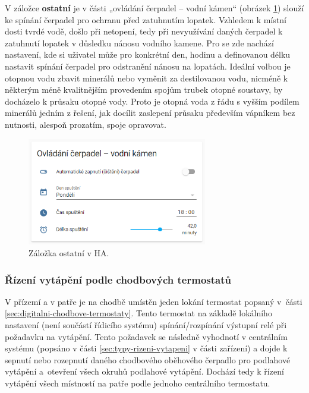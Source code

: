 V záložce \textbf{ostatní} je v části „ovládání čerpadel – vodní kámen“ (obrázek \ref{fig:zalozka-ostatni}) slouží ke spínání čerpadel pro ochranu před zatuhnutím lopatek. Vzhledem k místní dosti tvrdé vodě, došlo při netopení, tedy při nevyužívání daných čerpadel k zatuhnutí lopatek v důsledku nánosu vodního kamene. Pro se zde nachází nastavení, kde si uživatel může pro konkrétní den, hodinu a definovanou délku nastavit spínání čerpadel pro odstranění nánosu na lopatách. Ideální volbou je otopnou vodu zbavit minerálů nebo vyměnit za destilovanou vodu, nicméně k některým méně kvalitnějším provedením spojům trubek otopné soustavy, by docházelo k průsaku otopné vody. Proto je otopná voda z řádu s vyšším podílem minerálů jedním z řešení, jak docílit zaslepení průsaku především vápníkem bez nutnosti, alespoň prozatím, spoje opravovat.

\begin{figure}[H]
    \centering
    \includegraphics[width=0.7\textwidth]{images/software-ha/zalozka-ostatni.png}
    \caption{Záložka ostatní v HA.}
    \label{fig:zalozka-ostatni}
\end{figure}


\subsubsection{Řízení vytápění podle chodbových termostatů}
V přízemí a v patře je na chodbě umístěn jeden lokání termostat popsaný v~části \ref{sec:digitalni-chodbove-termostaty}. Tento termostat na základě lokálního nastavení (není součástí řídicího systému) spínání/rozpínání výstupní relé při požadavku na vytápění. Tento požadavek se následně vyhodnotí v centrálním systému (popsáno v části \ref{sec:typy-rizeni-vytapeni} v části zařízení) a dojde k sepnutí nebo rozepnutí daného chodbového oběhového čerpadlo pro podlahové vytápění a~otevření všech okruhů podlahové vytápění. Dochází tedy k řízení vytápění všech místností na patře podle jednoho centrálního termostatu. 

